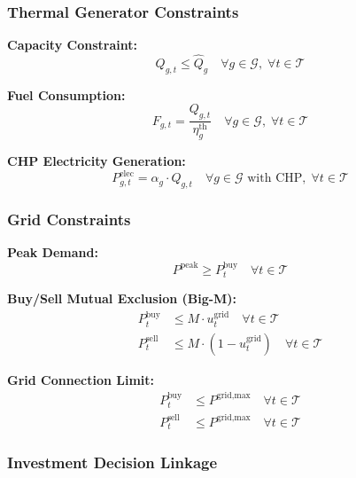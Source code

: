 \documentclass[11pt]{article}
\begin{document}
\subsubsection{Thermal Generator Constraints}

\textbf{Capacity Constraint:}
\begin{equation}
Q_{g,t} \leq \hat{Q}_g \quad \forall g \in \mathcal{G}, \; \forall t \in \mathcal{T}
\label{eq:gen_cap}
\end{equation}

\textbf{Fuel Consumption:}
\begin{equation}
F_{g,t} = \frac{Q_{g,t}}{\eta_g^{\text{th}}} \quad \forall g \in \mathcal{G}, \; \forall t \in \mathcal{T}
\label{eq:gen_fuel}
\end{equation}

\textbf{CHP Electricity Generation:}
\begin{equation}
P_{g,t}^{\text{elec}} = \alpha_g \cdot Q_{g,t} \quad \forall g \in \mathcal{G} \text{ with CHP}, \; \forall t \in \mathcal{T}
\label{eq:chp_elec}
\end{equation}

\subsubsection{Grid Constraints}

\textbf{Peak Demand:}
\begin{equation}
P^{\text{peak}} \geq P_t^{\text{buy}} \quad \forall t \in \mathcal{T}
\label{eq:grid_peak}
\end{equation}

\textbf{Buy/Sell Mutual Exclusion (Big-M):}
\begin{align}
P_t^{\text{buy}} &\leq M \cdot u_t^{\text{grid}} \quad \forall t \in \mathcal{T} \label{eq:grid_buy_binary} \\
P_t^{\text{sell}} &\leq M \cdot (1 - u_t^{\text{grid}}) \quad \forall t \in \mathcal{T} \label{eq:grid_sell_binary}
\end{align}

\textbf{Grid Connection Limit:}
\begin{align}
P_t^{\text{buy}} &\leq P^{\text{grid,max}} \quad \forall t \in \mathcal{T} \label{eq:grid_buy_limit} \\
P_t^{\text{sell}} &\leq P^{\text{grid,max}} \quad \forall t \in \mathcal{T} \label{eq:grid_sell_limit}
\end{align}

\subsubsection{Investment Decision Linkage}
\end{document}
